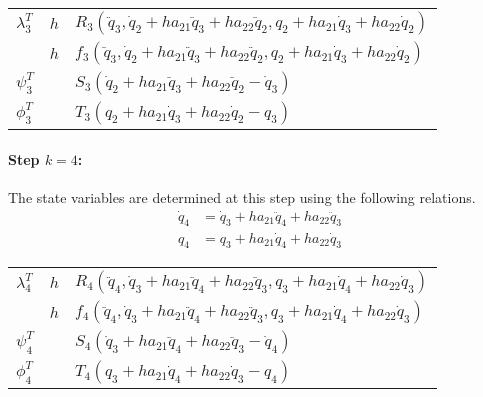 \documentclass[10pt,letter]{book}
\begin{document}
     \begin{table}[H]
       \centering
       \begin{tabular}{l | l  |l}
         $\lambda_{3}^T$  & $h$ & $R_3(\ddot{q}_3, \dot{q}_2 + h a_{21} \ddot{q}_{3} + h a_{22} \ddot{q}_{2}, q_2 + h a_{21} \dot{q}_{3} + h a_{22} \dot{q}_2)$ \\
                         & $h$ & $f_3(\ddot{q}_3, \dot{q}_2 + h a_{21} \ddot{q}_{3} + h a_{22} \ddot{q}_{2}, q_2 + h a_{21} \dot{q}_{3} + h a_{22} \dot{q}_2)$ \\
         $\psi_3^T$      &     & $S_3\left(\dot{q}_2 + h a_{21} \ddot{q}_{3} + h a_{22} \ddot{q}_{2} - \dot{q}_{3} \right)$ \\
         $\phi_3^T$      &     & $T_3\left(q_2 + h a_{21} \dot{q}_{3} + h a_{22} \dot{q}_2 - q_{3} \right) $ \\
       \end{tabular}
     \end{table}



    \paragraph{Step $k=4$:}
     The state variables are determined at this step using the
     following relations.
     \begin{equation}\nonumber
       \begin{split}
         \dot{q}_{4} &= \dot{q}_3 + h a_{21} \ddot{q}_{4} + h a_{22} \ddot{q}_{3} \\
         q_{4}       &=      q_3  + h a_{21} \dot{q}_{4}  + h a_{22} \dot{q}_{3}
       \end{split}
     \end{equation}

     \begin{table}[H]
       \centering
       \begin{tabular}{l | l  |l}
         $\lambda_{4}^T$  & $h$ & $R_4(\ddot{q}_4, \dot{q}_3 + h a_{21} \ddot{q}_{4} + h a_{22} \ddot{q}_{3} ,q_3 + h a_{21} \dot{q}_{4} + h a_{22} \dot{q}_3)$ \\
                         & $h$ & $f_4(\ddot{q}_4, \dot{q}_3 + h a_{21} \ddot{q}_{4} + h a_{22} \ddot{q}_{3} ,q_3 + h a_{21} \dot{q}_{4} + h a_{22} \dot{q}_3)$ \\
         $\psi_4^T$      &     & $S_4\left(\dot{q}_3 + h a_{21} \ddot{q}_{4} + h a_{22} \ddot{q}_{3} - \dot{q}_{4} \right)$ \\
         $\phi_4^T$      &     & $T_4\left(q_3 + h a_{21} \dot{q}_{4} + h a_{22} \dot{q}_3 - q_{4} \right) $ \\
       \end{tabular}
     \end{table}
\end{document}
